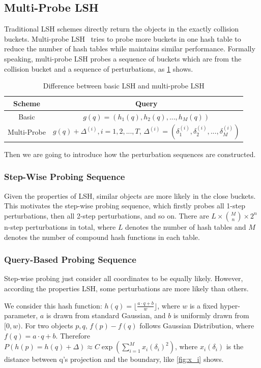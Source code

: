 \subsection{Multi-Probe LSH}
Traditional LSH schemes directly return the objects in the exactly collision buckets.
Multi-probe LSH~\cite{lv2007multi} tries to probe more buckets in one hash table to reduce the number of hash tables while maintains similar performance.
Formally speaking, multi-probe LSH probes a sequence of buckets which are from the collision bucket and a sequence of perturbations, as \cref{tbl:multi-probe-lsh} shows.
\begin{table}[hbt]
\centering
\caption{Difference between basic LSH and multi-probe LSH}
\begin{tabular}{|c|c|}
\hline
  \textbf{Scheme} & \textbf{Query}\\ \hline
  Basic& $g(q)=(h_1(q), h_2(q), ..., h_M(q))$ \\ \hline
  Multi-Probe& $g(q){+}\Delta^{(i)}, i{=}1,2,...,T$, $\Delta^{(i)}{=}(\delta_1^{(i)}, \delta_2^{(i)}, ..., \delta_M^{(i)})$ \\ \hline
\end{tabular}
\label{tbl:multi-probe-lsh}
\end{table}

Then we are going to introduce how the perturbation sequences are constructed.
\subsubsection{Step-Wise Probing Sequence}
Given the properties of LSH, similar objects are more likely in the close buckets.
This motivates the step-wise probing sequence, which firstly probes all 1-step perturbations, then all 2-step perturbations, and so on.
There are $L{\times} {M\choose n} {\times} 2^{n}$ n-step perturbations in total, where $L$ denotes the number of hash tables and $M$ denotes the number of compound hash functions in each table.

\subsubsection{Query-Based Probing Sequence}
Step-wise probing just consider all coordinates to be equally likely.
However, according the properties LSH, some perturbations are more likely than others.

We consider this hash function: $h(q)=\lfloor\frac{a\cdot q + b}{w}\rfloor$, where $w$ is a fixed hyper-parameter, $a$ is drawn from standard Gaussian, and $b$ is uniformly drawn from $[0, w)$.
For two objects $p, q$, $f(p) - f(q)$ follows Gaussian Distribution, where $f(q){=}a\cdot q {+} b$.
Therefore $P(h(p)=h(q)+\Delta)\approx C \exp(\sum_{i=1}^{M} x_i(\delta_i)^2)$, where $x_i(\delta_i)$ is the distance between q's projection and the boundary, like \cref{fig:x_i} shows.

